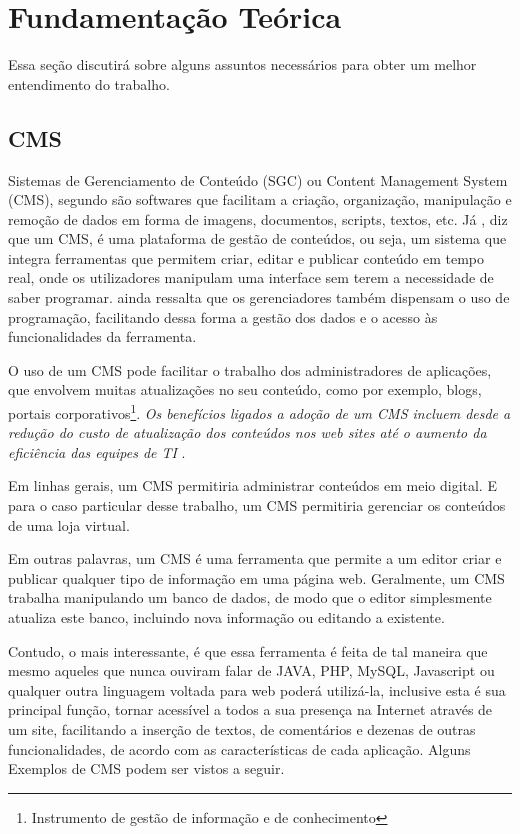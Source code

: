 \documentclass[a4paper,12pt]{monografia}
\begin{document}
\chapter{Fundamentação Teórica} %
\label{cha:fundamentaco_teorica}

Essa seção discutirá sobre alguns assuntos necessários para obter um melhor entendimento do trabalho.

\section{CMS} %
\label{sec:cms}

Sistemas de Gerenciamento de Conteúdo (SGC) ou Content Management System (CMS), segundo  são softwares que facilitam a criação, organização, manipulação e remoção de dados em forma de imagens, documentos, scripts, textos, etc.
Já , diz que um CMS, é uma plataforma de gestão de conteúdos, ou seja, um sistema que integra ferramentas que permitem criar, editar e publicar conteúdo em tempo real, onde os utilizadores manipulam uma interface sem terem a necessidade de saber programar.  ainda ressalta que os gerenciadores também dispensam o uso de programação, facilitando dessa forma a gestão dos dados e o acesso às funcionalidades da ferramenta.

O uso de um CMS pode facilitar o trabalho dos administradores de aplicações, que envolvem muitas atualizações no seu conteúdo, como por exemplo, blogs, portais corporativos\footnote{Instrumento de gestão de informação e de conhecimento}. \textit{Os benefícios ligados a adoção de um CMS incluem desde a redução do custo de atualização dos conteúdos nos web sites até o aumento da eficiência das equipes de TI} \cite{pereira}.

Em linhas gerais, um CMS permitiria administrar conteúdos em meio digital. E para o caso particular desse trabalho, um CMS permitiria gerenciar os conteúdos de uma loja virtual.

Em outras palavras, um CMS é uma ferramenta que permite a um editor criar e publicar qualquer tipo de informação em uma página web. Geralmente, um CMS trabalha manipulando um banco de dados, de modo que o editor simplesmente atualiza este banco, incluindo nova informação ou editando a existente.

Contudo, o mais interessante, é que essa ferramenta é feita de tal maneira que mesmo aqueles que nunca ouviram falar de JAVA, PHP, MySQL, Javascript ou qualquer outra linguagem voltada para web poderá utilizá-la, inclusive esta é sua principal função, tornar acessível a todos a sua presença na Internet através de um site, facilitando a inserção de textos, de comentários e dezenas de outras funcionalidades, de acordo com as características de cada aplicação. Alguns Exemplos de CMS podem ser vistos a seguir.
\end{document}
